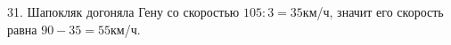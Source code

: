31. Шапокляк догоняла Гену со скоростью $105:3=35$км/ч, значит его скорость равна $90-35=55$км/ч.\\
